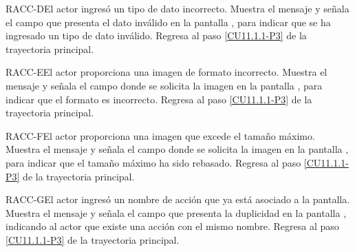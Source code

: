 \begin{UCtrayectoriaA}{RACC-D}{El actor ingresó un tipo de dato incorrecto.}
	\UCpaso[\UCsist] Muestra el mensaje  y señala el campo que presenta el dato inválido en la pantalla , para indicar que se ha ingresado un tipo de dato inválido.
	\UCpaso Regresa al paso \ref{CU11.1.1-P3} de la trayectoria principal.
\end{UCtrayectoriaA}

\begin{UCtrayectoriaA}{RACC-E}{El actor proporciona una imagen de formato incorrecto.}
	\UCpaso[\UCsist] Muestra el mensaje  y señala el campo donde se solicita la imagen en la pantalla , para indicar que el formato es incorrecto.
	\UCpaso Regresa al paso \ref{CU11.1.1-P3} de la trayectoria principal.
\end{UCtrayectoriaA}

\begin{UCtrayectoriaA}{RACC-F}{El actor proporciona una imagen que excede el tamaño máximo.}
	\UCpaso[\UCsist] Muestra el mensaje  y señala el campo donde se solicita la imagen en la pantalla , para indicar que el tamaño máximo ha sido rebasado.
	\UCpaso Regresa al paso \ref{CU11.1.1-P3} de la trayectoria principal.
\end{UCtrayectoriaA}

\begin{UCtrayectoriaA}{RACC-G}{El actor ingresó un nombre de acción que ya está asociado a la pantalla.}
	\UCpaso[\UCsist] Muestra el mensaje  y señala el campo que presenta la duplicidad en la pantalla , indicando al actor que existe una acción con el mismo nombre.
	\UCpaso Regresa al paso \ref{CU11.1.1-P3} de la trayectoria principal.
\end{UCtrayectoriaA}